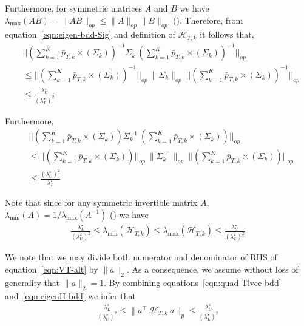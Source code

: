 \documentclass[11pt,letterpaper]{article}
\theoremstyle{plain}
\theoremstyle{definition}  %
\begin{document}
\noindent Furthermore, for symmetric matrices $A$ and $B$ we have $\lambda_{\max}(AB) = \| AB \|_{op} \leq \|A\|_{op} \|B\|_{op}$ (\cite{rao2000linear}). Therefore, from equation~\eqref{eqn:eigen-bdd-Sig} and definition of $\mathcal{H}_{T,k}$ it follows that,
\begin{align*}
    &\bigg| \bigg| \left(\sum^K_{k=1} \bar{p}_{T,k} \times (\Sigma_k) \right)^{-1} \Sigma_k \ \left(\sum^K_{k=1} \bar{p}_{T,k} \times (\Sigma_k) \right)^{-1} \bigg| \bigg|_{op}\\[8pt]
    &\leq 
     \bigg| \bigg| \left(\sum^K_{k=1} \bar{p}_{T,k} \times (\Sigma_k) \right)^{-1} \bigg| \bigg|_{op} \ \|\Sigma_k \|_{op}\ \bigg| \bigg|\left(\sum^K_{k=1} \bar{p}_{T,k} \times (\Sigma_k) \right)^{-1} \bigg| \bigg|_{op}\\[8pt]
     & \leq \frac{\lambda^\star_U}{(\lambda^\star_L)^2}
\end{align*}

\noindent Furthermore,
\begin{align*}
    &\bigg| \bigg| \left(\sum^K_{k=1} \bar{p}_{T,k} \times (\Sigma_k) \right) \Sigma_k^{-1} \ \left(\sum^K_{k=1} \bar{p}_{T,k} \times (\Sigma_k) \right) \bigg| \bigg|_{op}\\[8pt]
    &\leq 
     \bigg| \bigg| \left(\sum^K_{k=1} \bar{p}_{T,k} \times (\Sigma_k) \right) \bigg| \bigg|_{op} \ \|\Sigma_k^{-1} \|_{op}\ \bigg| \bigg|\left(\sum^K_{k=1} \bar{p}_{T,k} \times (\Sigma_k) \right)\bigg| \bigg|_{op}\\[8pt]
     & \leq \frac{(\lambda^\star_U)^2}{\lambda^\star_L}
\end{align*}

\noindent Note that since for any symmetric invertible matrix $A$, $\lambda_{\min}(A) =1/ \lambda_{\max}(A^{-1})$ (\citet{rao2000linear}) we have
\begin{align}\label{eqn:eigenH-bdd}
  \frac{\lambda^\star_L}{(\lambda^\star_U)^2} \leq   \lambda_{\min}(\mathcal{H}_{T,k}) \leq \lambda_{\max}(\mathcal{H}_{T,k}) \leq \frac{\lambda^\star_U}{(\lambda^\star_L)^2}
\end{align}

\noindent We note that we may divide both numerator and denominator of RHS of equation~\eqref{eqn:VT-alt} by $\|a\|_2$. As a consequence, we assume without loss of generality that $\|a\|_2 = 1$. By combining equations~\eqref{eqn:quad Tlvec-bdd} and~\eqref{eqn:eigenH-bdd} we infer that
\begin{align}\label{eqn:Hquad-bdd}
    \frac{\lambda^\star_L}{(\lambda^\star_U)^2} \leq \| a^\top \ \mathcal{H}_{T,k} \ a \|_p
    \leq \frac{\lambda^\star_U}{(\lambda^\star_L)^2}
\end{align}
\end{document}
